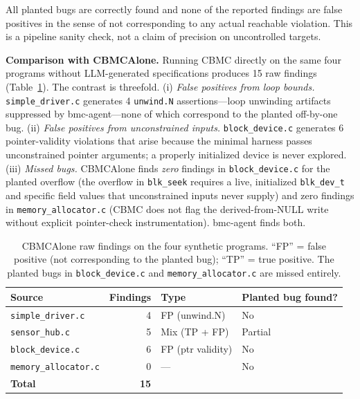 \documentclass[11pt,a4paper]{article}
\newcommand{\tool}{bmc-agent\xspace}
\begin{document}
All planted bugs are correctly found and none of the reported findings are
false positives in the sense of not corresponding to any actual reachable
violation. This is a pipeline sanity check, not a claim of precision on
uncontrolled targets.

\smallskip\noindent\textbf{Comparison with CBMCAlone.}
Running CBMC directly on the same four programs without LLM-generated
specifications produces 15 raw findings (Table~\ref{tab:cbmc-alone}).
The contrast is threefold.
(i) \emph{False positives from loop bounds.}
\texttt{simple\_driver.c} generates 4 \texttt{unwind.N} assertions---loop
unwinding artifacts suppressed by \tool---none of which correspond to the
planted off-by-one bug.
(ii) \emph{False positives from unconstrained inputs.}
\texttt{block\_device.c} generates 6 pointer-validity violations that arise
because the minimal harness passes unconstrained pointer arguments; a
properly initialized device is never explored.
(iii) \emph{Missed bugs.}
CBMCAlone finds \emph{zero} findings in \texttt{block\_device.c} for the
planted overflow (the overflow in \texttt{blk\_seek} requires a live, initialized
\texttt{blk\_dev\_t} and specific field values that unconstrained inputs never
supply) and zero findings in \texttt{memory\_allocator.c} (CBMC does not flag
the derived-from-NULL write without explicit pointer-check instrumentation).
\tool finds both.

\begin{table}[t]
\caption{CBMCAlone raw findings on the four synthetic programs. ``FP'' = false
positive (not corresponding to the planted bug); ``TP'' = true positive. The
planted bugs in \texttt{block\_device.c} and \texttt{memory\_allocator.c} are
missed entirely.}
\label{tab:cbmc-alone}
\small
\begin{tabular}{lrll}
\toprule
Source & Findings & Type & Planted bug found? \\
\midrule
\texttt{simple\_driver.c}     & 4 & FP (unwind.N) & No \\
\texttt{sensor\_hub.c}        & 5 & Mix (TP + FP) & Partial \\
\texttt{block\_device.c}      & 6 & FP (ptr validity) & No \\
\texttt{memory\_allocator.c}  & 0 & --- & No \\
\midrule
\textbf{Total}                & \textbf{15} & & \\
\bottomrule
\end{tabular}
\end{table}
\end{document}

